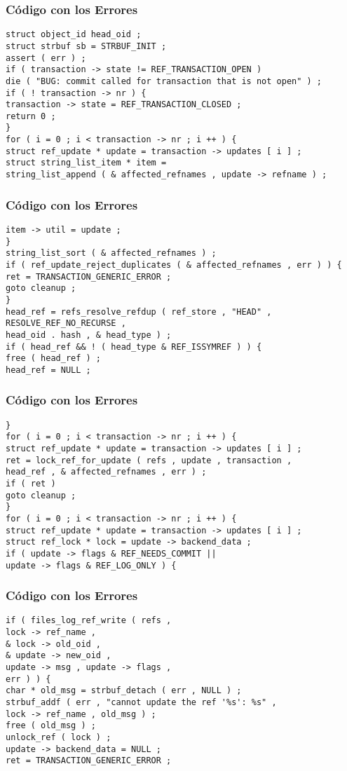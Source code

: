 \documentclass{beamer}
\begin{document}
\begin{frame}[fragile]
\frametitle{C\'odigo con los Errores}
\begin{verbatim}
struct object_id head_oid ; 
struct strbuf sb = STRBUF_INIT ; 
assert ( err ) ; 
if ( transaction -> state != REF_TRANSACTION_OPEN ) 
die ( "BUG: commit called for transaction that is not open" ) ; 
if ( ! transaction -> nr ) { 
transaction -> state = REF_TRANSACTION_CLOSED ; 
return 0 ; 
} 
for ( i = 0 ; i < transaction -> nr ; i ++ ) { 
struct ref_update * update = transaction -> updates [ i ] ; 
struct string_list_item * item = 
string_list_append ( & affected_refnames , update -> refname ) ; 
\end{verbatim}
\end{frame}
\begin{frame}[fragile]
\frametitle{C\'odigo con los Errores}
\begin{verbatim}
item -> util = update ; 
} 
string_list_sort ( & affected_refnames ) ; 
if ( ref_update_reject_duplicates ( & affected_refnames , err ) ) { 
ret = TRANSACTION_GENERIC_ERROR ; 
goto cleanup ; 
} 
head_ref = refs_resolve_refdup ( ref_store , "HEAD" , 
RESOLVE_REF_NO_RECURSE , 
head_oid . hash , & head_type ) ; 
if ( head_ref && ! ( head_type & REF_ISSYMREF ) ) { 
free ( head_ref ) ; 
head_ref = NULL ; 
\end{verbatim}
\end{frame}
\begin{frame}[fragile]
\frametitle{C\'odigo con los Errores}
\begin{verbatim}
} 
for ( i = 0 ; i < transaction -> nr ; i ++ ) { 
struct ref_update * update = transaction -> updates [ i ] ; 
ret = lock_ref_for_update ( refs , update , transaction , 
head_ref , & affected_refnames , err ) ; 
if ( ret ) 
goto cleanup ; 
} 
for ( i = 0 ; i < transaction -> nr ; i ++ ) { 
struct ref_update * update = transaction -> updates [ i ] ; 
struct ref_lock * lock = update -> backend_data ; 
if ( update -> flags & REF_NEEDS_COMMIT || 
update -> flags & REF_LOG_ONLY ) { 
\end{verbatim}
\end{frame}
\begin{frame}[fragile]
\frametitle{C\'odigo con los Errores}
\begin{verbatim}
if ( files_log_ref_write ( refs , 
lock -> ref_name , 
& lock -> old_oid , 
& update -> new_oid , 
update -> msg , update -> flags , 
err ) ) { 
char * old_msg = strbuf_detach ( err , NULL ) ; 
strbuf_addf ( err , "cannot update the ref '%s': %s" , 
lock -> ref_name , old_msg ) ; 
free ( old_msg ) ; 
unlock_ref ( lock ) ; 
update -> backend_data = NULL ; 
ret = TRANSACTION_GENERIC_ERROR ; 
\end{verbatim}
\end{frame}
\end{document}
